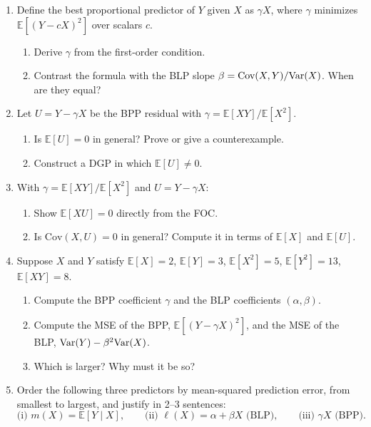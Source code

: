 \documentclass{article}
\newcommand{\E}{\mathbb{E}}
\begin{document}
\begin{enumerate}[label=\textbf{C.\arabic*},leftmargin=*,itemsep=10pt]

\item Define the best proportional predictor of $Y$ given $X$ as $\gamma X$, where $\gamma$ minimizes $\E[(Y - cX)^2]$ over scalars $c$.
\begin{enumerate}[label=(\alph*)]
  \item Derive $\gamma$ from the first-order condition.
  \item Contrast the formula with the BLP slope $\beta = \text{Cov}(X,Y)/\mbox{Var}(X)$.  When are they equal?
\end{enumerate}

\item Let $U = Y - \gamma X$ be the BPP residual with $\gamma = \E[XY]/\E[X^2]$.
\begin{enumerate}[label=(\alph*)]
  \item Is $\E[U] = 0$ in general?  Prove or give a counterexample.
  \item Construct a DGP in which $\E[U] \neq 0$.
\end{enumerate}

\item With $\gamma = \E[XY]/\E[X^2]$ and $U = Y - \gamma X$:
\begin{enumerate}[label=(\alph*)]
  \item Show $\E[XU] = 0$ directly from the FOC.
  \item Is $\text{Cov}(X, U) = 0$ in general?  Compute it in terms of $\E[X]$ and $\E[U]$.
\end{enumerate}

\item Suppose $X$ and $Y$ satisfy $\E[X] = 2$, $\E[Y] = 3$, $\E[X^2] = 5$, $\E[Y^2] = 13$, $\E[XY] = 8$.
\begin{enumerate}[label=(\alph*)]
  \item Compute the BPP coefficient $\gamma$ and the BLP coefficients $(\alpha, \beta)$.
  \item Compute the MSE of the BPP, $\E[(Y - \gamma X)^2]$, and the MSE of the BLP, $\mbox{Var}(Y) - \beta^2\mbox{Var}(X)$.
  \item Which is larger?  Why must it be so?
\end{enumerate}

\item Order the following three predictors by mean-squared prediction error, from smallest to largest, and justify in 2--3 sentences:
$$\text{(i) } m(X) = \E[Y\mid X], \qquad \text{(ii) } \ell(X) = \alpha + \beta X \text{ (BLP)}, \qquad \text{(iii) } \gamma X \text{ (BPP)}.$$

\end{enumerate}
\end{document}
